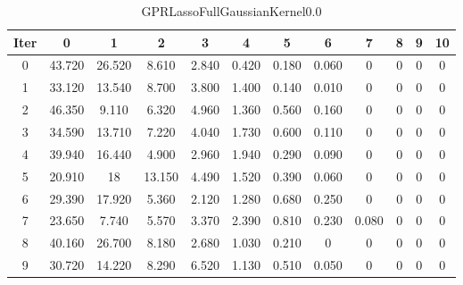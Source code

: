 \begin{table}
	\begin{center}
		\begin{tabular}{|c|c|c|c|c|c|c|c|c|c|c|c|}
			\hline
			Iter & 0 & 1 & 2 & 3 & 4 & 5 & 6 & 7 & 8 & 9 & 10 \\
			\hline
			0 & 43.720 & 26.520 & 8.610 & 2.840 & 0.420 & 0.180 & 0.060 & 0 & 0 & 0 & 0 \\
			\hline
			1 & 33.120 & 13.540 & 8.700 & 3.800 & 1.400 & 0.140 & 0.010 & 0 & 0 & 0 & 0 \\
			\hline
			2 & 46.350 & 9.110 & 6.320 & 4.960 & 1.360 & 0.560 & 0.160 & 0 & 0 & 0 & 0 \\
			\hline
			3 & 34.590 & 13.710 & 7.220 & 4.040 & 1.730 & 0.600 & 0.110 & 0 & 0 & 0 & 0 \\
			\hline
			4 & 39.940 & 16.440 & 4.900 & 2.960 & 1.940 & 0.290 & 0.090 & 0 & 0 & 0 & 0 \\
			\hline
			5 & 20.910 & 18 & 13.150 & 4.490 & 1.520 & 0.390 & 0.060 & 0 & 0 & 0 & 0 \\
			\hline
			6 & 29.390 & 17.920 & 5.360 & 2.120 & 1.280 & 0.680 & 0.250 & 0 & 0 & 0 & 0 \\
			\hline
			7 & 23.650 & 7.740 & 5.570 & 3.370 & 2.390 & 0.810 & 0.230 & 0.080 & 0 & 0 & 0 \\
			\hline
			8 & 40.160 & 26.700 & 8.180 & 2.680 & 1.030 & 0.210 & 0 & 0 & 0 & 0 & 0 \\
			\hline
			9 & 30.720 & 14.220 & 8.290 & 6.520 & 1.130 & 0.510 & 0.050 & 0 & 0 & 0 & 0 \\
			\hline
		\end{tabular}
	\end{center}
	\caption{GPRLassoFullGaussianKernel0.0}
\end{table}